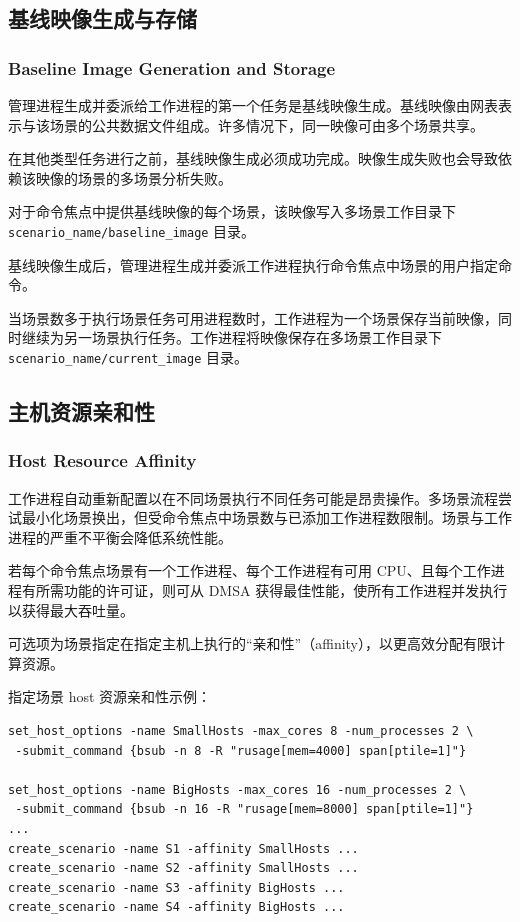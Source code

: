 \subsection{基线映像生成与存储}
\subsubsection*{Baseline Image Generation and Storage}

管理进程生成并委派给工作进程的第一个任务是基线映像生成。基线映像由网表表示与该场景的公共数据文件组成。许多情况下，同一映像可由多个场景共享。

在其他类型任务进行之前，基线映像生成必须成功完成。映像生成失败也会导致依赖该映像的场景的多场景分析失败。

对于命令焦点中提供基线映像的每个场景，该映像写入多场景工作目录下 \texttt{scenario\_name/baseline\_image} 目录。

基线映像生成后，管理进程生成并委派工作进程执行命令焦点中场景的用户指定命令。

当场景数多于执行场景任务可用进程数时，工作进程为一个场景保存当前映像，同时继续为另一场景执行任务。工作进程将映像保存在多场景工作目录下 \texttt{scenario\_name/current\_image} 目录。

\subsection{主机资源亲和性}
\subsubsection*{Host Resource Affinity}

工作进程自动重新配置以在不同场景执行不同任务可能是昂贵操作。多场景流程尝试最小化场景换出，但受命令焦点中场景数与已添加工作进程数限制。场景与工作进程的严重不平衡会降低系统性能。

若每个命令焦点场景有一个工作进程、每个工作进程有可用 CPU、且每个工作进程有所需功能的许可证，则可从 DMSA 获得最佳性能，使所有工作进程并发执行以获得最大吞吐量。

可选项为场景指定在指定主机上执行的``亲和性''（affinity），以更高效分配有限计算资源。



指定场景 host 资源亲和性示例：
\begin{lstlisting}
set_host_options -name SmallHosts -max_cores 8 -num_processes 2 \
 -submit_command {bsub -n 8 -R "rusage[mem=4000] span[ptile=1]"}

set_host_options -name BigHosts -max_cores 16 -num_processes 2 \
 -submit_command {bsub -n 16 -R "rusage[mem=8000] span[ptile=1]"}
...
create_scenario -name S1 -affinity SmallHosts ...
create_scenario -name S2 -affinity SmallHosts ...
create_scenario -name S3 -affinity BigHosts ...
create_scenario -name S4 -affinity BigHosts ...
\end{lstlisting}

